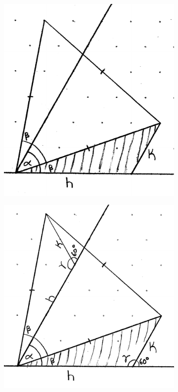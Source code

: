 \documentclass[12pt,letter]{article}
\begin{document}
\begin{figure}[h]
	\centering
	\caption{Locating Point P}
	\begin{subfigure}[h]{0.45\textwidth}
		\includegraphics[width = \textwidth]{ddagger4.pdf}
		\caption{}
		\label{fig:equil_angles}
	\end{subfigure}
	\begin{subfigure}[h]{0.45\textwidth}
		\includegraphics[width = \textwidth]{ddagger5.pdf}
		\caption{}
		\label{fig:equil_congruent}
	\end{subfigure}
\end{figure}
\end{document}
